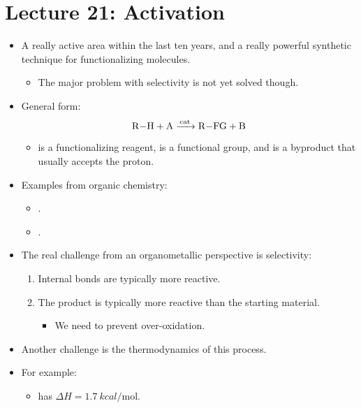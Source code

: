 \documentclass[../notes.tex]{subfiles}
\begin{document}
\section{Lecture 21:  Activation}
\begin{itemize}
    \item {}A really active area within the last ten years, and a really powerful synthetic technique for functionalizing molecules.
    \begin{itemize}
        \item The major problem with selectivity is not yet solved though.
    \end{itemize}
    \item General form:
    \begin{equation*}
        \ce{R-H + A ->[{cat}] R-FG + B}
    \end{equation*}
    \begin{itemize}
        \item {} is a functionalizing reagent,  is a functional group, and  is a byproduct that usually accepts the proton.
    \end{itemize}
    \item Examples from organic chemistry:
    \begin{itemize}
        \item {}.
        \item {}.
    \end{itemize}
    \item The real challenge from an organometallic perspective is selectivity:
    \begin{enumerate}
        \item Internal  bonds are typically more reactive.
        \item The product is typically more reactive than the starting material.
        \begin{itemize}
            \item We need to prevent over-oxidation.
        \end{itemize}
    \end{enumerate}
    \item Another challenge is the thermodynamics of this process.
    \item For example:
    \begin{itemize}
        \item {} has $\Delta H=\SI{1.7}{kcal\per\mole}$.

\end{itemize}
\end{itemize}
\end{document}
